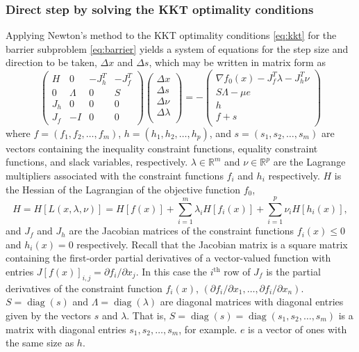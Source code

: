 \subsubsection*{Direct step by solving the KKT optimality conditions}
Applying Newton's method to the KKT optimality conditions \eqref{eq:kkt} for the barrier subproblem \eqref{eq:barrier} yields a system of equations for the step size and direction to be taken, $\Delta x$ and $\Delta s$, which may be written in matrix form as \citep[p. 566]{Nocedal06}
\begin{equation}
\begin{pmatrix}
H   & 0       & -J_h^T & -J_f^T \\
0   & \Lambda & 0      & S \\
J_h & 0       & 0      & 0 \\
J_f & -I      & 0      & 0
\end{pmatrix}
\begin{pmatrix}
\Delta x  \\
\Delta s  \\
\Delta \nu \\
\Delta \lambda \\
\end{pmatrix}
= -
\begin{pmatrix}
\nabla f_0(x) - J_f^T \lambda - J_h^T \nu  \\
S\Lambda - \mu e \\
h \\
f + s \\
\end{pmatrix}
\end{equation}
where $f = (f_1, f_2, \dots, f_m)$, $h = (h_1, h_2, \dots, h_p)$, and $s = (s_1, s_2, \dots, s_m)$ are vectors containing the inequality constraint functions, equality constraint functions, and slack variables, respectively. $\lambda \in \mathbb{R}^m$ and $\nu \in \mathbb{R}^p$ are the Lagrange multipliers associated with the constraint functions $f_i$ and $h_i$ respectively. $H$ is the Hessian of the Lagrangian of the objective function $f_0$,
\begin{equation}
H = H[L(x,\lambda,\nu)] = H[f(x)] + \sum_{i=1}^m \lambda_i H[f_i(x)] + \sum_{i=1}^p \nu_i H[h_i(x)],
\end{equation}
and $J_f$ and $J_h$ are the Jacobian matrices of the constraint functions $f_i(x) \le 0$ and $h_i(x) = 0$ respectively. Recall that the Jacobian matrix is a square matrix containing the first-order partial derivatives of a vector-valued function with entries $J[f(x)]_{i,j} = \partial f_i / \partial x_j$. In this case the $i^\mathrm{th}$ row of $J_f$ is the partial derivatives of the constraint function $f_i(x)$, $(\partial f_i/\partial x_1, \dots, \partial f_i/\partial x_n)$. $S = \operatorname{diag}(s)$ and $\Lambda = \operatorname{diag}(\lambda)$ are diagonal matrices with diagonal entries given by the vectors $s$ and $\lambda$. That is, $S = \operatorname{diag}(s) = \operatorname{diag}(s_1, s_2, \dots, s_m)$ is a matrix with diagonal entries $s_1, s_2, \dots, s_m$, for example. $e$ is a vector of ones with the same size as $h$.


